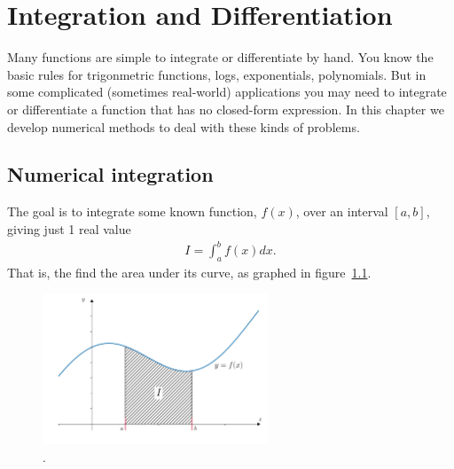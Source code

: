 \chapter{Integration and Differentiation} \label{ch:intdiff}

Many functions are simple to integrate or differentiate by hand. You know the basic rules for trigonmetric functions, logs, exponentials, polynomials. But in some complicated (sometimes real-world) applications you may need to integrate or differentiate a function that has no closed-form expression. In this chapter we develop numerical methods to deal with these kinds of problems.

\section{Numerical integration}
The goal is to integrate some known function, $f(x)$, over an interval $[a,b]$, giving just 1 real value
\begin{align*}
I = \int_a^b f(x) dx.
\end{align*}
That is, the find the area under its curve, as graphed in figure~\ref{fig:ch5_integration}.

\begin{figure}[H]
	\begin{center}
	\includegraphics[width=0.6\textwidth]{figures/ch5_integration.pdf} 
	  \caption{.} \label{fig:ch5_integration}
	\end{center}
\end{figure}

